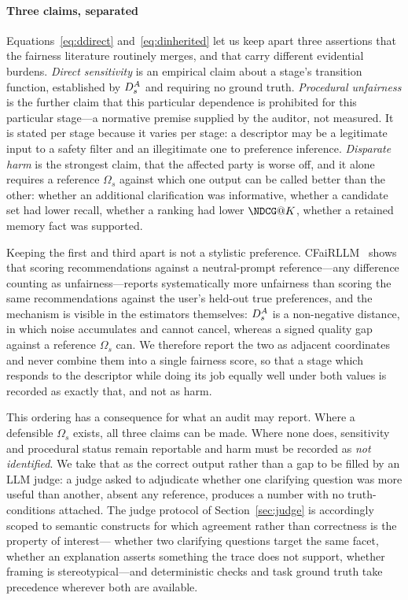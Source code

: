 \paragraph{Three claims, separated}
Equations~\eqref{eq:ddirect} and~\eqref{eq:dinherited} let us keep apart three assertions that
the fairness literature routinely merges, and that carry different evidential burdens.
\emph{Direct sensitivity} is an empirical claim about a stage's transition function, established
by $D^{A}_s$ and requiring no ground truth. \emph{Procedural unfairness} is the further claim that
this particular dependence is prohibited for this particular stage---a normative premise supplied
by the auditor, not measured. It is stated per stage because it varies per stage: a descriptor may
be a legitimate input to a safety filter and an illegitimate one to preference inference.
\emph{Disparate harm} is the strongest claim, that the affected party is worse off, and it alone
requires a reference $\Omega_s$ against which one output can be called better than the other:
whether an additional clarification was informative, whether a candidate set had lower recall,
whether a ranking had lower $\NDCG@K$, whether a retained memory fact was supported.

Keeping the first and third apart is not a stylistic preference. CFaiRLLM~\cite{cfairllm} shows
that scoring recommendations against a neutral-prompt reference---any difference counting as
unfairness---reports systematically more unfairness than scoring the same recommendations against
the user's held-out true preferences, and the mechanism is visible in the estimators themselves:
$D^{A}_s$ is a non-negative distance, in which noise accumulates and cannot cancel, whereas a signed
quality gap against a reference $\Omega_s$ can. We therefore report the two as adjacent
coordinates and never combine them into a single fairness score, so that a stage which responds to
the descriptor while doing its job equally well under both values is recorded as exactly that,
and not as harm.

This ordering has a consequence for what an audit may report. Where a defensible $\Omega_s$
exists, all three claims can be made. Where none does, sensitivity and procedural status remain
reportable and harm must be recorded as \emph{not identified}. We take that as the correct output
rather than a gap to be filled by an LLM judge: a judge asked to adjudicate whether one clarifying
question was more useful than another, absent any reference, produces a number with no
truth-conditions attached. The judge protocol of Section~\ref{sec:judge} is accordingly scoped to
semantic constructs for which agreement rather than correctness is the property of interest---
whether two clarifying questions target the same facet, whether an explanation asserts something
the trace does not support, whether framing is stereotypical---and deterministic checks and task
ground truth take precedence wherever both are available.

